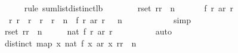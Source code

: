 \begin{isabellebody}
\ \ \ \ \isamarkupfalse%
\ {\isacharparenleft}rule\ sum{\isacharunderscore}list{\isacharunderscore}distinct{\isacharunderscore}lb{\isacharparenright}\isanewline
\ \ \ \ \ \ \isamarkupfalse%
\ {\isachardoublequoteopen}{\isasymforall}r{\isacharprime}{\isasymin}set\ {\isacharbrackleft}r{}{\isachardot}{\isachardot}{\isacharless}{\isacharparenleft}r{}\ {\isacharplus}\ n\ {\isacharminus}\ {}{\isacharparenright}\ {\isacharplus}\ {}{\isacharbrackright}{\isachardot}\ {}{}{}{}\ {\isacharless}\ f\ r{\isacharprime}\ {\isacharparenleft}ar\ r{\isacharprime}{\isacharparenright}{\isachardoublequoteclose}\isanewline
\ \ \ \ \ \ \ \ \isamarkupfalse%
\ {\isacharbackquoteopen}{\isasymforall}\ r{\isachardot}\ r{}\ {\isasymle}\ r\ {\isasymand}\ r\ {\isacharless}\ r{}\ {\isacharplus}\ n\ {\isasymlongrightarrow}\ f\ r\ {\isacharparenleft}ar\ r{\isacharparenright}\ {\isachargreater}\ {}{}{}{}{\isacharbackquoteclose}\ {\isacharbackquoteopen}n\ {\isasymge}\ {}{}{}{}{\isacharbackquoteclose}\isanewline
\ \ \ \ \ \ \ \ \isamarkupfalse%
\ simp\isanewline
\ \ \ \ \ \ \isamarkupfalse%
\ \isamarkupfalse%
\ {\isachardoublequoteopen}{\isasymforall}r{\isacharprime}{\isasymin}set\ {\isacharbrackleft}r{}{\isachardot}{\isachardot}{\isacharless}{\isacharparenleft}r{}\ {\isacharplus}\ n\ {\isacharminus}\ {}{\isacharparenright}{\isacharplus}\ {}{\isacharbrackright}{\isachardot}\ {}{}{}{}\ {\isacharless}\ nat\ {\isacharparenleft}f\ r{\isacharprime}\ {\isacharparenleft}ar\ r{\isacharprime}{\isacharparenright}{\isacharparenright}{\isachardoublequoteclose}\isanewline
\ \ \ \ \ \ \ \ \isamarkupfalse%
\ auto\isanewline
\ \ \ \ \isamarkupfalse%
\isanewline
\ \ \ \ \ \ \isamarkupfalse%
\ {\isachardoublequoteopen}distinct\ {\isacharparenleft}map\ {\isacharparenleft}{\isasymlambda}x{\isachardot}\ nat\ {\isacharparenleft}f\ x\ {\isacharparenleft}ar\ x{\isacharparenright}{\isacharparenright}{\isacharparenright}\ {\isacharbrackleft}r{}{\isachardot}{\isachardot}{\isacharless}{\isacharparenleft}r{}\ {\isacharplus}\ n\ {\isacharminus}\ {}{\isacharparenright}\ {\isacharplus}\ {}{\isacharbrackright}{\isacharparenright}{\isachardoublequoteclose}\isanewline

\end{isabellebody}
